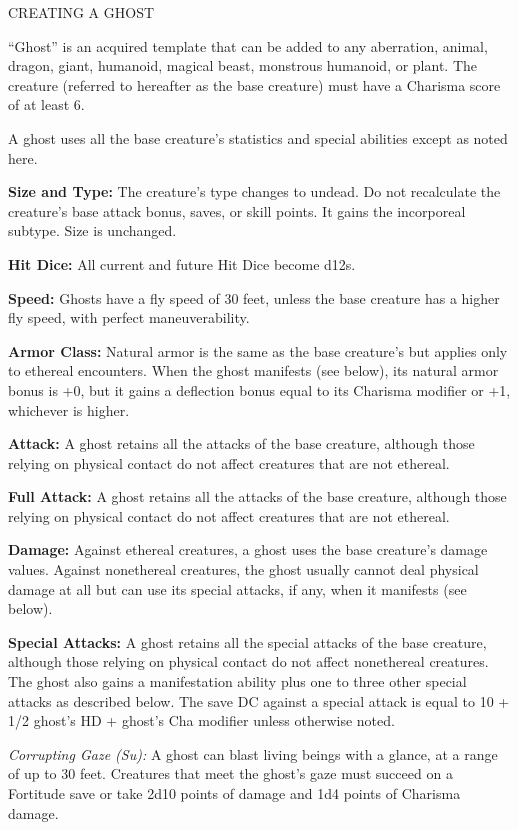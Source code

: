 \documentclass{article}
\begin{document}
\vspace{12pt}
CREATING A GHOST

``Ghost'' is an acquired template that can be added to any aberration, animal, 
dragon, giant, humanoid, magical beast, monstrous humanoid, or plant. The creature 
(referred to hereafter as the base creature) must have a Charisma score of at least 
6.

A ghost uses all the base creature's statistics and special abilities except as 
noted here.

\textbf{Size and Type:} The creature's type changes to undead. Do not recalculate 
the creature's base attack bonus, saves, or skill points. It gains the incorporeal 
subtype. Size is unchanged.

\textbf{Hit Dice:} All current and future Hit Dice become d12s.

\textbf{Speed:} Ghosts have a fly speed of 30 feet, unless the base creature has 
a higher fly speed, with perfect maneuverability. 

\textbf{Armor Class:} Natural armor is the same as the base creature's but applies 
only to ethereal encounters. When the ghost manifests (see below), its natural 
armor bonus is +0, but it gains a deflection bonus equal to its Charisma modifier 
or +1, whichever is higher.

\textbf{Attack:} A ghost retains all the attacks of the base creature, although 
those relying on physical contact do not affect creatures that are not ethereal.

\textbf{Full Attack:} A ghost retains all the attacks of the base creature, although 
those relying on physical contact do not affect creatures that are not ethereal.

\textbf{Damage:} Against ethereal creatures, a ghost uses the base creature's damage 
values. Against nonethereal creatures, the ghost usually cannot deal physical damage 
at all but can use its special attacks, if any, when it manifests (see below).

\textbf{Special Attacks:} A ghost retains all the special attacks of the base creature, 
although those relying on physical contact do not affect nonethereal creatures. 
The ghost also gains a manifestation ability plus one to three other special attacks 
as described below. The save DC against a special attack is equal to 10 + 1/2 ghost's 
HD + ghost's Cha modifier unless otherwise noted.

\textit{Corrupting Gaze (Su): }A ghost can blast living beings with a glance, at 
a range of up to 30 feet. Creatures that meet the ghost's gaze must succeed on 
a Fortitude save or take 2d10 points of damage and 1d4 points of Charisma damage.
\end{document}
